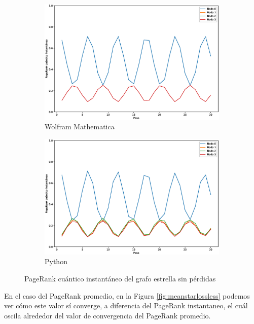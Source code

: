 \begin{figure}[H]
    \centering
    \begin{subfigure}[m]{0.45\textwidth}
        \centering
        \includegraphics[width=0.9\linewidth]{img/star-inst-M.eps}
        \caption{Wolfram Mathematica}
    \end{subfigure}
    \begin{subfigure}[m]{0.45\textwidth}
        \centering
        \includegraphics[width=0.9\linewidth]{img/star-inst-lossless.eps}
        \caption{Python}
    \end{subfigure}
    \caption[PageRank cuántico instantáneo del grafo estrella sin pérdidas]{PageRank cuántico instantáneo del grafo estrella sin pérdidas}
    \label{fig:inststarlossless}
\end{figure}

En el caso del PageRank promedio, en la Figura \ref{fig:meanstarlossless} podemos ver cómo este valor sí converge, a diferencia del PageRank instantaneo, el cuál oscila alrededor del valor de convergencia del PageRank promedio.

